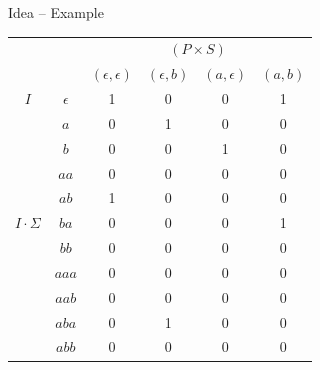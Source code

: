\documentclass{beamer}
\begin{document}

\begin{frame}{Idea -- Example}
    \begin{center}
        \begin{tabular}{|cc|c|c|c|c|} 
    \multicolumn{2}{c|}{} & \multicolumn{4}{c|}{$(P\times S)$} \\
    \multicolumn{2}{c|}{} & $(\epsilon,\epsilon)$ & $(\epsilon,b)$ & $(a,\epsilon)$ & $(a,b)$ \\ \hline
    $I$ & $\epsilon$ & 1 & 0 & 0 & 1 \\ 
        & $a$        & 0 & 1 & 0 & 0 \\
        & $b$        & 0 & 0 & 1 & 0 \\ 
        & $aa$       & 0 & 0 & 0 & 0 \\ 
        & $ab$       & 1 & 0 & 0 & 0 \\ \hline
    $I \cdot \Sigma$ & $ba$  & 0 & 0 & 0 & 1 \\
        & $bb$       & 0 & 0 & 0 & 0 \\ 
        & $aaa$      & 0 & 0 & 0 & 0 \\ 
        & $aab$      & 0 & 0 & 0 & 0 \\ 
        & $aba$      & 0 & 1 & 0 & 0 \\ 
        & $abb$      & 0 & 0 & 0 & 0 \\ \hline
\end{tabular}
    \end{center}
\end{frame}
\end{document}
